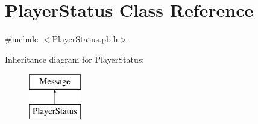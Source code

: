 \hypertarget{class_player_status}{\section{Player\-Status Class Reference}
\label{class_player_status}
}


{\ttfamily \#include $<$Player\-Status.\-pb.\-h$>$}

Inheritance diagram for Player\-Status\-:\begin{figure}[H]
\begin{center}
\leavevmode
\includegraphics[height=2.000000cm]{class_player_status}
\end{center}
\end{figure}
